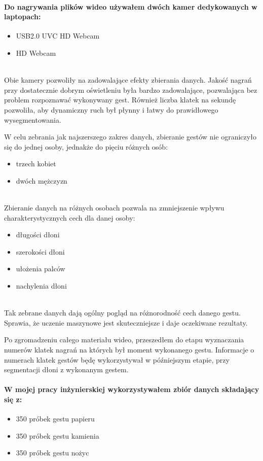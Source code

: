 \documentclass[a4paper,12pt,twoside,openany]{report}
\begin{document}
\paragraph{Do nagrywania plików wideo używałem dwóch kamer dedykowanych w laptopach:}
\begin{itemize}
	\item USB2.0 UVC HD Webcam
	\item HD Webcam
\end{itemize}
\mbox{} \\

Obie kamery pozwoliły na zadowalające efekty zbierania danych. Jakość nagrań przy dostatecznie dobrym oświetleniu była bardzo zadowalające, pozwalająca bez problem rozpoznawać wykonywany gest. Również liczba klatek na sekundę pozwoliła, aby dynamiczny ruch był płynny i łatwy do prawidłowego wysegmentowania.

W celu zebrania jak najszerszego zakres danych, zbieranie gestów nie ograniczyło się do jednej osoby, jednakże do pięciu różnych osób:
\begin{itemize}
	\item trzech kobiet
	\item dwóch mężczyzn
\end{itemize}
\mbox{} \\
\indent 
Zbieranie danych na różnych osobach pozwala na zmniejszenie wpływu charakterystycznych cech dla danej osoby:
\begin{itemize}
	\item długości dłoni
	\item szerokości dłoni
	\item ułożenia palców
	\item nachylenia dłoni
\end{itemize}
\mbox{} \\
\indent
Tak zebrane danych dają ogólny pogląd na różnorodność cech danego gestu. Sprawia, że uczenie maszynowe jest skuteczniejsze i daje oczekiwane rezultaty. 

Po zgromadzeniu całego materiału wideo, przeszedłem do etapu wyznaczania numerów klatek nagrań na których był moment wykonanego gestu. Informacje o numerach klatek gestów będę wykorzystywał w późniejszym etapie, przy segmentacji dłoni z wykonanym gestem.

\paragraph{W mojej pracy inżynierskiej wykorzystywałem zbiór danych składający się z:}
\begin{itemize}
	\item 350 próbek gestu papieru
	\item 350 próbek gestu kamienia
	\item 350 próbek gestu nożyc
\end{itemize}
\end{document}
